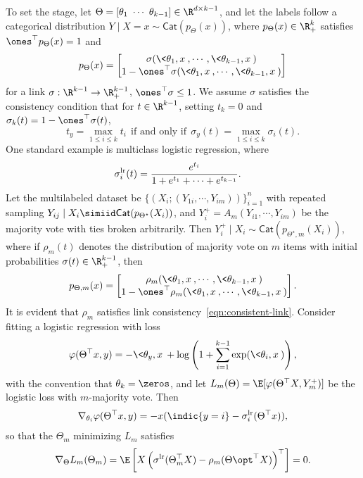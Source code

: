 \documentclass[11pt]{article}
\newcommand{\prn}[1]{\left({#1}\right)} %
\newcommand{\brk}[1]{\left[{#1}\right]} %
\newcommand{\cat}{\mathsf{Cat}}  %
\newcommand{\lr}{^{\textup{lr}}}  %
\newcommand{\sloss}{\varphi}  %
\begin{document}
To set the stage, let
$\Theta = [\theta_1 ~ \cdots ~ \theta_{k-1}] \in \R^{d \times k-1}$,
and let the labels follow a categorical distribution $Y
\mid X = x\sim \cat(p_\Theta(x))$, where $p_\Theta(x) \in \R^k_+$ satisfies
$\ones^\top p_\Theta(x) = 1$ and
\begin{align*}
  p_\Theta(x) = \begin{bmatrix}
    \sigma(\< \theta_1 , x \>, \cdots, \< \theta_{k-1} , x \>) \\
    1 - \ones^\top \sigma(\< \theta_1 , x \>, \cdots, \< \theta_{k-1} , x \>)
  \end{bmatrix}
\end{align*}
for a link $\sigma : \R^{k-1} \to \R^{k-1}_+$,
$\ones^\top \sigma \le 1$.
%
We assume $\sigma$ satisfies the consistency condition that for $t \in
\R^{k-1}$, setting $t_k = 0$ and $\sigma_k(t) = 1 - \ones^\top \sigma(t)$,
\begin{equation}
  \label{eqn:consistent-link}
  t_y = \max_{1 \leq i \leq k} t_i
  ~~ \mbox{if and only if} ~~
  \sigma_y(t) = \max_{1 \leq i \leq k} \sigma_i(t). 
\end{equation}
One standard example is multiclass logistic regression, where
\begin{align*}
  \sigma_i\lr(t) & = \frac{e^{t_i}}{1 + e^{t_1} + \cdots + e^{t_{k-1}}}.
\end{align*}
Let the multilabeled dataset be $\{(X_i; (Y_{1i}, \cdots,
Y_{im}))\}_{i=1}^n$ with repeated sampling $Y_{ij} \mid X_i \simiid
\cat(p_{\Theta^\star}(X_i))$, and $Y_i^+ = A_m(Y_{i1}, \cdots, Y_{im})$ be
the majority vote with ties broken arbitrarily.
%
Then $Y_i^+ \mid X_i \sim \cat(p_{\Theta^\star,m}(X_i))$, where if
$\rho_m(t)$ denotes the distribution of majority vote on $m$ items with
initial probabilities $\sigma(t) \in \R^{k-1}_+$, then
\begin{align*}
  p_{\Theta, m}(x) = \begin{bmatrix}
    \rho_m(\< \theta_1 , x \>, \cdots, \< \theta_{k-1} , x \>) \\
    1 - \ones^\top \rho_m(\< \theta_1 , x \>, \cdots, \< \theta_{k-1} , x \>)
  \end{bmatrix}.
\end{align*}
It is evident that $\rho_m$ satisfies link
consistency~\eqref{eqn:consistent-link}.
%
Consider fitting a logistic regression with loss
\begin{align}
  \sloss(\Theta^\top x, y)
  =- \< \theta_y, x \> + \log \prn{1 + \sum_{i=1}^{k-1} \exp(\<\theta_i, x\>)}, \label{eq:logistic-loss}
\end{align}
with the convention that $\theta_k = \zeros$,
and let $L_m(\Theta) = \E[\sloss(\Theta^\top X, Y_m^+)]$ be the
logistic loss with $m$-majority vote.
%
Then
\begin{align*}
  \nabla_{\theta_i} \sloss(\Theta^\top x, y)
  = -x (\indic{y=i} - \sigma_i\lr(\Theta^\top x)),
\end{align*}
so that the $\Theta_m$ minimizing $L_m$ satisfies
\begin{align*}
  \nabla_{\Theta} L_m(\Theta_m)
  = \E \brk{X \prn{\sigma\lr(\Theta_m^\top X)
      - \rho_m({\Theta\opt}^\top X)}^\top}
  = 0.
\end{align*}
\end{document}
